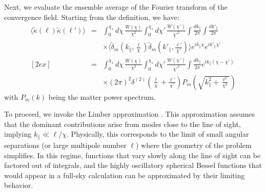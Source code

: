 Next, we evaluate the ensemble average of the Fourier transform of the convergence field. Starting from the definition, we have:
\begin{eqnarray}
    \langle \tilde{\kappa}(\boldsymbol{\ell}) \tilde{\kappa}(\boldsymbol{\ell}') \rangle 
    &=& \int_0^{\chi_s} d\chi \, \frac{W(\chi)}{\chi^2} \int_0^{\chi_s} d\chi' \, \frac{W(\chi')}{\chi'^2} 
        \int \frac{dk_\parallel}{2\pi} \int \frac{dk'_\parallel}{2\pi} \nonumber \\
    && \times \langle \tilde{\delta}_m\left(k_\parallel, \frac{\boldsymbol{\ell}}{\chi}\right) 
       \tilde{\delta}_m\left(k'_\parallel, \frac{\boldsymbol{\ell}'}{\chi'}\right) \rangle 
       e^{i k_\parallel \chi} e^{i k'_\parallel \chi'} \nonumber \\
    [2ex]
    &=& \int_0^{\chi_s} d\chi \, \frac{W(\chi)}{\chi^2} \int_0^{\chi_s} d\chi' \, \frac{W(\chi')}{\chi'^2} 
        \int \frac{dk_\parallel}{2\pi} e^{i k_\parallel (\chi - \chi')} \nonumber \\
    && \times (2\pi)^2 \delta^{(2)}\left(\frac{\boldsymbol{\ell}}{\chi} + \frac{\boldsymbol{\ell}'}{\chi'}\right) 
       P_m\left(\sqrt{k_\parallel^2 + \frac{\ell^2}{\chi^2}}\right) \nonumber 
    \label{eq:kappa_power_spectrum}
\end{eqnarray}
with \( P_m(k) \) being the matter power spectrum.

To proceed, we invoke the Limber approximation \citep{1954ApJ...119..655L}. This approximation assumes that the dominant contributions arise from modes close to the line of sight, implying \( k_\parallel \ll \ell/\chi \).
Physically, this corresponds to the limit of small angular separations (or large multipole number $\ell$) where the geometry of the problem simplifies. In this regime, functions that vary slowly along the line of sight can be factored out of integrals, and the highly oscillatory spherical Bessel functions that would appear in a full-sky calculation can be approximated by their limiting behavior. 

